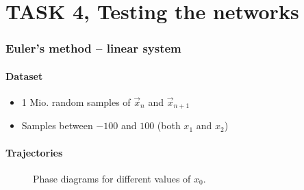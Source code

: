 \section{TASK 4, Testing the networks}

\begin{frame}
	\frametitle{Euler's method -- linear system}
	\paragraph{Dataset}\vspace{-2mm}
	\begin{itemize}
		\item 1 Mio. random samples of $\overrightarrow{x}_{n}$ and $\overrightarrow{x}_{n+1}$
		\item Samples between $-100$ and $100$ (both $x_1$ and $x_2$)
	\end{itemize}
	\paragraph{Trajectories}\vspace{-2mm}
	\begin{figure}[H]
		\quad
		\quad
		\caption{Phase diagrams for different values of $x_0$.}
	\end{figure}
\end{frame}

